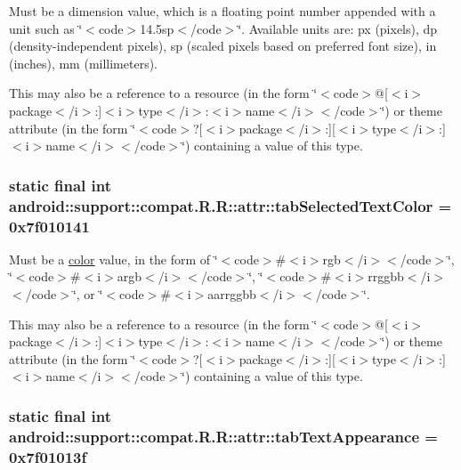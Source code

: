 Must be a dimension value, which is a floating point number appended with a unit such as \char`\"{}$<$code$>$14.5sp$<$/code$>$\char`\"{}. Available units are: px (pixels), dp (density-independent pixels), sp (scaled pixels based on preferred font size), in (inches), mm (millimeters). 

This may also be a reference to a resource (in the form \char`\"{}$<$code$>$@\mbox{[}$<$i$>$package$<$/i$>$:\mbox{]}$<$i$>$type$<$/i$>$:$<$i$>$name$<$/i$>$$<$/code$>$\char`\"{}) or theme attribute (in the form \char`\"{}$<$code$>$?\mbox{[}$<$i$>$package$<$/i$>$:\mbox{]}\mbox{[}$<$i$>$type$<$/i$>$:\mbox{]}$<$i$>$name$<$/i$>$$<$/code$>$\char`\"{}) containing a value of this type. \hypertarget{classandroid_1_1support_1_1compat_1_1_r_1_1attr_a70448855edbd05d0fe3bdb625d640f0}{
\subsubsection[{tabSelectedTextColor}]{\setlength{\rightskip}{0pt plus 5cm}static final int android::support::compat.R.R::attr::tabSelectedTextColor = 0x7f010141}}
\label{classandroid_1_1support_1_1compat_1_1_r_1_1attr_a70448855edbd05d0fe3bdb625d640f0}


Must be a \hyperlink{classandroid_1_1support_1_1compat_1_1_r_1_1color}{color} value, in the form of \char`\"{}$<$code$>$\#$<$i$>$rgb$<$/i$>$$<$/code$>$\char`\"{}, \char`\"{}$<$code$>$\#$<$i$>$argb$<$/i$>$$<$/code$>$\char`\"{}, \char`\"{}$<$code$>$\#$<$i$>$rrggbb$<$/i$>$$<$/code$>$\char`\"{}, or \char`\"{}$<$code$>$\#$<$i$>$aarrggbb$<$/i$>$$<$/code$>$\char`\"{}. 

This may also be a reference to a resource (in the form \char`\"{}$<$code$>$@\mbox{[}$<$i$>$package$<$/i$>$:\mbox{]}$<$i$>$type$<$/i$>$:$<$i$>$name$<$/i$>$$<$/code$>$\char`\"{}) or theme attribute (in the form \char`\"{}$<$code$>$?\mbox{[}$<$i$>$package$<$/i$>$:\mbox{]}\mbox{[}$<$i$>$type$<$/i$>$:\mbox{]}$<$i$>$name$<$/i$>$$<$/code$>$\char`\"{}) containing a value of this type. \hypertarget{classandroid_1_1support_1_1compat_1_1_r_1_1attr_fa45e2b0f7d89ea07a4aa6ac7dc79c90}{
\subsubsection[{tabTextAppearance}]{\setlength{\rightskip}{0pt plus 5cm}static final int android::support::compat.R.R::attr::tabTextAppearance = 0x7f01013f}}
\label{classandroid_1_1support_1_1compat_1_1_r_1_1attr_fa45e2b0f7d89ea07a4aa6ac7dc79c90}


